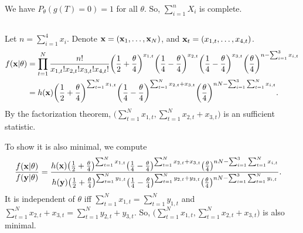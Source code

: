 We have $P_\theta(g(T)=0)=1$ for all $\theta$.
So, $\sum_{i=1}^n X_i$ is complete.

\subsection{} %

Let $n=\sum_{i=1}^4 x_i$. Denote $\mathbf{x}=(\mathbf{x}_1,\dots,\mathbf{x}_N)$,
and $\mathbf{x}_t=(x_{1,t}, \dots, x_{4,t})$.
\begin{align}
    f(\mathbf{x}|\theta)
        &= \prod_{t=1}^N \frac{n!}{x_{1,t}!x_{2,t}!x_{3,t}!x_{4,t}!}
            \bigg(\frac{1}{2}+\frac{\theta}{4}\bigg)^{x_{1,t}}
            \bigg(\frac{1}{4}-\frac{\theta}{4}\bigg)^{x_{2,t}}
            \bigg(\frac{1}{4}-\frac{\theta}{4}\bigg)^{x_{3,t}}
            \bigg(\frac{\theta}{4}\bigg)^{n-\sum_{i=1}^3 x_{i,t}} \\
        &=  h(\mathbf{x})
            \bigg(\frac{1}{2}+\frac{\theta}{4}\bigg)^{\sum_{t=1}^N x_{1,t}}
            \bigg(\frac{1}{4}-\frac{\theta}{4}\bigg)^{\sum_{t=1}^N x_{2,t} + x_{3,t}}
            \bigg(\frac{\theta}{4}\bigg)^{nN-\sum_{i=1}^3\sum_{t=1}^N  x_{i,t}}.
\end{align}
By the factorization theorem,
$\big(\sum_{t=1}^N x_{1,t}, \sum_{t=1}^N x_{2,t} + x_{3,t}\big)$
is an sufficient statistic.

To show it is also minimal, we compute
\begin{align}
    \frac{f(\mathbf{x}|\theta)}{f(\mathbf{y}|\theta)}
        &= \frac{
            h(\mathbf{x})
            \big(\frac{1}{2}+\frac{\theta}{4}\big)^{\sum_{t=1}^N x_{1,t}}
            \big(\frac{1}{4}-\frac{\theta}{4}\big)^{\sum_{t=1}^N x_{2,t} + x_{3,t}}
            \big(\frac{\theta}{4}\big)^{nN-\sum_{i=1}^3\sum_{t=1}^N  x_{i,t}}
        }{
            h(\mathbf{y})
            \big(\frac{1}{2}+\frac{\theta}{4}\big)^{\sum_{t=1}^N y_{1,t}}
            \big(\frac{1}{4}-\frac{\theta}{4}\big)^{\sum_{t=1}^N y_{2,t} + y_{3,t}}
            \big(\frac{\theta}{4}\big)^{nN-\sum_{i=1}^3\sum_{t=1}^N  y_{i,t}}
        }.
\end{align}
It is independent of $\theta$ iff
$\sum_{t=1}^N x_{1,t} = \sum_{t=1}^N y_{1,t}$ and
$\sum_{t=1}^N x_{2,t} + x_{3,t} = \sum_{t=1}^N y_{2,t} + y_{3,t}$.
So, $\big(\sum_{t=1}^N x_{1,t}, \sum_{t=1}^N x_{2,t} + x_{3,t}\big)$
is also minimal.

\subsection{} %

